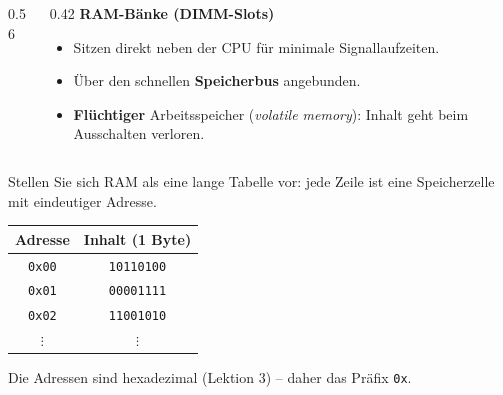 \renewcommand{\thelektion}{L11 \textperiodcentered{} Aufbau eines Computers II}

{
\begin{frame}
\end{frame}}

\begin{frame}
\begin{columns}[c,onlytextwidth]
    \begin{column}{0.56\textwidth}
        \centering
    \end{column}
    \begin{column}{0.42\textwidth}
        \large\bfseries\color{Teal!90!black}RAM-Bänke (DIMM-Slots)\par\vspace{3mm}
        \normalsize\normalfont
        \begin{itemize}\setlength\itemsep{6pt}
            \item Sitzen direkt neben der CPU für minimale Signallaufzeiten.
            \item Über den schnellen \textbf{Speicherbus} angebunden.
            \item \textbf{Flüchtiger} Arbeitsspeicher (\emph{volatile memory}): Inhalt geht beim Ausschalten verloren.
        \end{itemize}
    \end{column}
\end{columns}
\end{frame}

\begin{frame}
\begin{center}
Stellen Sie sich RAM als eine lange Tabelle vor: jede Zeile ist eine Speicherzelle mit eindeutiger Adresse.
\end{center}
\begin{table}[H]
    \centering
    \begin{tabular}{cc}
        \textbf{Adresse} & \textbf{Inhalt (1 Byte)} \\\midrule
        \texttt{0x00} & \texttt{10110100} \\
        \texttt{0x01} & \texttt{00001111} \\
        \texttt{0x02} & \texttt{11001010} \\
        $\vdots$ & $\vdots$ \\
    \end{tabular}
\end{table}
\begin{center}
Die Adressen sind hexadezimal (Lektion 3) -- daher das Präfix \texttt{0x}.
\end{center}
\end{frame}

